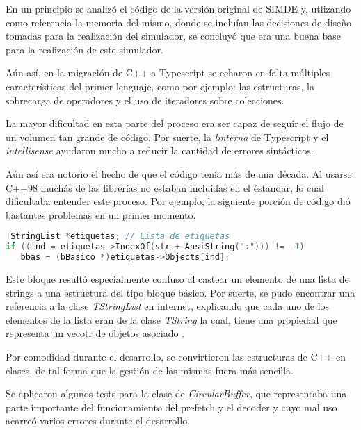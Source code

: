 En un principio se analizó el código de la versión original de SIMDE\cite{SIMDE} y, utlizando como
referencia la memoria del mismo, donde se incluían las decisiones de diseño
tomadas para la realización del simulador, se concluyó que era una buena base para la realización 
de este simulador.

\bigskip
Aún así, en la migración de C++ a Typescript se echaron en falta múltiples características del primer lenguaje,
como por ejemplo: las estructuras, la sobrecarga de operadores y el uso de iteradores sobre colecciones.

\bigskip
La mayor dificultad en esta parte del proceso era ser capaz de seguir el flujo de un volumen tan grande
de código. Por suerte, la \textit{linterna} de Typescript y el \textit{intellisense} ayudaron mucho a reducir la cantidad
de errores sintácticos.

\bigskip
Aún así era notorio el hecho de que el código tenía más de una década. Al usarse C++98 muchás de las librerías
no estaban incluidas en el éstandar, lo cual dificultaba entender este proceso. Por ejemplo, la siguiente
porción de código dió bastantes problemas en un primer momento.

\begin{lstlisting}[language=C++]
TStringList *etiquetas; // Lista de etiquetas
if ((ind = etiquetas->IndexOf(str + AnsiString(":"))) != -1)
   bbas = (bBasico *)etiquetas->Objects[ind];
\end{lstlisting}

\bigskip
Este bloque resultó especialmente confuso al castear un elemento de una lista de strings 
a una estructura del tipo bloque básico. Por suerte, se pudo encontrar una referencia 
a la clase \textit{TStringList} en internet, explicando que cada uno de los elementos de la lista
eran de la clase \textit{TString} la cual, tiene una propiedad que representa un vecotr de objetos
asociado \cite{TStringObjects} .

\bigskip
Por comodidad durante el desarrollo, se convirtieron las estructuras de C++ en clases, de tal forma
que la gestión de las mismas fuera más sencilla.

\bigskip
Se aplicaron algunos tests para la clase de \textit{CircularBuffer}, que representaba una parte importante
del funcionamiento del prefetch y el decoder y cuyo mal uso acarreó varios errores durante el desarrollo.